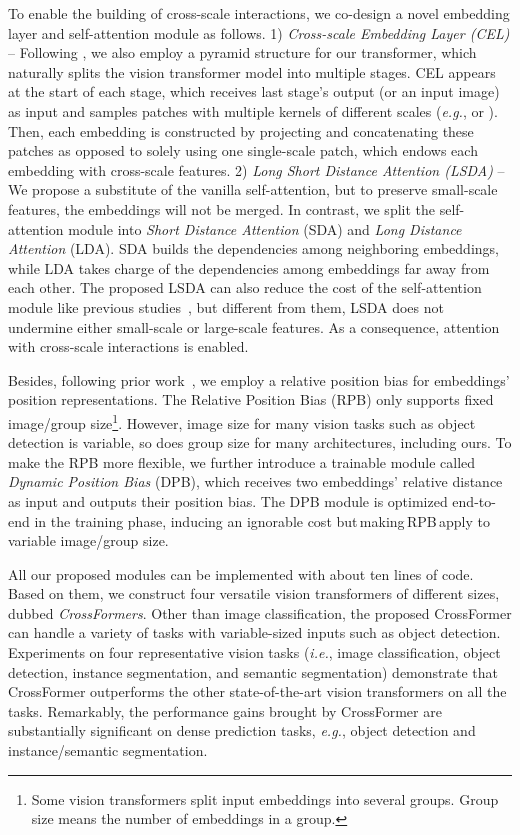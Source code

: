 \documentclass{article} \usepackage{iclr2022_conference,times}
\newcommand{\ie}{{\emph{i.e.}}}
\newcommand{\eg}{{\emph{e.g.}}}
\begin{document}
To enable the building of cross-scale interactions, we co-design a novel embedding layer and self-attention module as follows. 1) \emph{Cross-scale Embedding Layer (CEL)} -- Following \citet{DBLP:journals/corr/abs-2102-12122}, we also employ a pyramid structure for our transformer, which naturally splits the vision transformer model into multiple stages. CEL appears at the start of each stage, which receives last stage's output (or an input image) as input and samples patches with multiple kernels of different scales (\eg,  or ).
Then, each embedding is constructed by projecting and concatenating these patches as opposed to solely using one single-scale patch, which endows each embedding with cross-scale features.
2) \emph{Long Short Distance Attention (LSDA)} -- We propose a substitute of the vanilla self-attention, but to preserve small-scale features, the embeddings will not be merged. In contrast, we split the self-attention module into \textit{Short Distance Attention} (SDA) and \textit{Long Distance Attention} (LDA).
SDA builds the dependencies among neighboring embeddings, while LDA takes charge of the dependencies among embeddings far away from each other.
The proposed LSDA can also reduce the cost of the self-attention module like previous studies~\citep{DBLP:journals/corr/abs-2102-12122,DBLP:journals/corr/abs-2104-13840}, but different from them, LSDA does not undermine either small-scale or large-scale features. As a consequence, attention with cross-scale interactions is enabled.

Besides, following prior work~\citep{DBLP:conf/naacl/ShawUV18,DBLP:journals/corr/abs-2103-14030}, we employ a relative position bias for embeddings' position representations.
The Relative Position Bias (RPB) only supports fixed image/group size\footnote{Some vision transformers split input embeddings into several groups. Group size means the number of embeddings in a group.}. However, image size for many vision tasks such as object detection is variable, so does group size for many architectures, including ours.
To make the RPB more flexible, we further introduce a trainable module called \textit{Dynamic Position Bias} (DPB), which receives two embeddings' relative distance as input and outputs their position bias. The DPB module is optimized end-to-end in the training phase, inducing an ignorable cost but\,making\,RPB\,apply to variable image/group size.

All our proposed modules can be implemented with about ten lines of code.
Based on them, we construct four versatile vision transformers of different sizes, dubbed \emph{CrossFormers}. Other than image classification, the proposed CrossFormer can handle a variety of tasks with variable-sized inputs such as object detection. Experiments on four representative vision tasks (\ie, image classification, object detection, instance segmentation, and semantic segmentation) demonstrate that CrossFormer outperforms the other state-of-the-art vision transformers on all the tasks.
Remarkably, the performance gains brought by CrossFormer are substantially significant on dense prediction tasks, \eg, object detection and instance/semantic segmentation.
\end{document}

